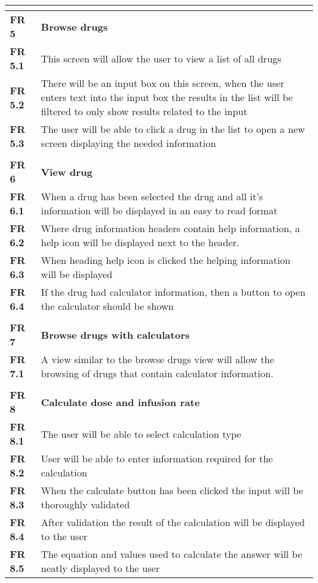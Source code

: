 \begin{center}
\begin{longtable}{| l | p{13cm} |}
\textbf{}  &  \\ \hline
\textbf{FR 5}   & \textbf{Browse drugs}\\ \hline
\textbf{FR 5.1} & This screen will allow the user to view a list of all drugs  \\ \hline
\textbf{FR 5.2} & There will be an input box on this screen, when the user enters text into the input box the results in the list will be filtered to only show results related to the input \\ \hline
\textbf{FR 5.3} & The user will be able to click a drug in the list to open a new screen displaying the needed information  \\ \hline
\textbf{}  &  \\ \hline
\textbf{FR 6}   & \textbf{View drug}   \\ \hline
\textbf{FR 6.1} & When a drug has been selected the drug and all it's information will be displayed in an easy to read format    \\ \hline
\textbf{FR 6.2} & Where drug information headers contain help information, a help icon will be displayed next to the header.\\ \hline
\textbf{FR 6.3} & When heading help icon is clicked the helping information will be displayed \\ \hline
\textbf{FR 6.4} & If the drug had calculator information, then a button to open the calculator should be shown    \\ \hline
\textbf{}  &  \\ \hline
\textbf{FR 7}   & \textbf{Browse drugs with calculators}   \\ \hline
\textbf{FR 7.1} & A view similar to the browse drugs view will allow the browsing of drugs that contain calculator information.  \\ \hline
\textbf{}  &  \\ \hline
\textbf{FR 8}   & \textbf{Calculate dose and infusion rate}\\ \hline
\textbf{FR 8.1} & The user will be able to select calculation type   \\ \hline
\textbf{FR 8.2} & User will be able to enter information required for the calculation    \\ \hline
\textbf{FR 8.3} & When the calculate button has been clicked the input will be thoroughly validated\\ \hline
\textbf{FR 8.4} & After validation the result of the calculation will be displayed to the user\\ \hline
\textbf{FR 8.5} & The equation and values used to calculate the answer will be neatly displayed to the user  \\ \hline

\end{longtable}
\end{center}

